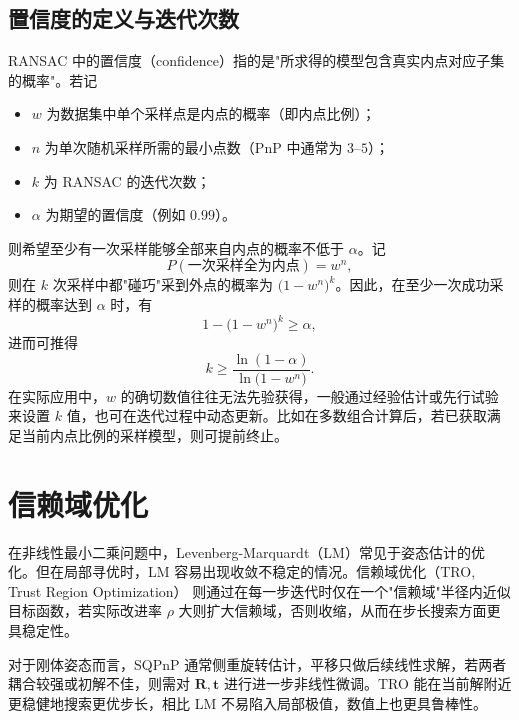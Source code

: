 \subsection{置信度的定义与迭代次数}
RANSAC 中的置信度（confidence）指的是"所求得的模型包含真实内点对应子集的概率"。若记
\begin{itemize}
	\item $w$ 为数据集中单个采样点是内点的概率（即内点比例）；
	\item $n$ 为单次随机采样所需的最小点数（PnP 中通常为 $3$--$5$）；
	\item $k$ 为 RANSAC 的迭代次数；
	\item $\alpha$ 为期望的置信度（例如 $0.99$）。
\end{itemize}
则希望至少有一次采样能够全部来自内点的概率不低于 $\alpha$。记
\begin{equation}
	P(\text{一次采样全为内点})  =  w^n,
\end{equation}
则在 $k$ 次采样中都"碰巧"采到外点的概率为 $\bigl(1 - w^n \bigr)^k$。因此，在至少一次成功采样的概率达到 $\alpha$ 时，有
\begin{equation}
	1 - \bigl(1 - w^n \bigr)^k   \ge   \alpha,
\end{equation}
进而可推得
\begin{equation}
	k  \ge  \frac{\ln(1 - \alpha)}{\ln\bigl(1 - w^n\bigr)}.
\end{equation}
在实际应用中，$w$ 的确切数值往往无法先验获得，一般通过经验估计或先行试验来设置 $k$ 值，也可在迭代过程中动态更新。比如在多数组合计算后，若已获取满足当前内点比例的采样模型，则可提前终止。


\vspace{1em}




\section{信赖域优化}
\label{sec:RANSAC-TRO-SQPnP:TRO}
在非线性最小二乘问题中，Levenberg-Marquardt（LM）常见于姿态估计的优化。但在局部寻优时，LM 容易出现收敛不稳定的情况。信赖域优化（TRO, Trust Region Optimization）\cite{trf} 则通过在每一步迭代时仅在一个"信赖域"半径内近似目标函数，若实际改进率 $\rho$ 大则扩大信赖域，否则收缩，从而在步长搜索方面更具稳定性。

对于刚体姿态而言，SQPnP 通常侧重旋转估计，平移只做后续线性求解，若两者耦合较强或初解不佳，则需对 $\mathbf{R}, \mathbf{t}$ 进行进一步非线性微调。TRO 能在当前解附近更稳健地搜索更优步长，相比 LM 不易陷入局部极值，数值上也更具鲁棒性。

